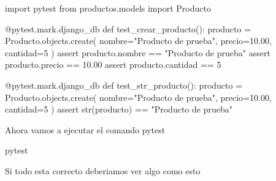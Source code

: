 \documentclass[
  a4paper,
  DIV=11,
  numbers=noendperiod,
  onepage,
  openany]{scrreprt}
\newenvironment{Shaded}{\begin{snugshade}}{\end{snugshade}}
\newcommand{\AttributeTok}[1]{\textcolor[rgb]{0.40,0.45,0.13}{#1}}
\newcommand{\BuiltInTok}[1]{\textcolor[rgb]{0.00,0.23,0.31}{#1}}
\newcommand{\ControlFlowTok}[1]{\textcolor[rgb]{0.00,0.23,0.31}{#1}}
\newcommand{\DecValTok}[1]{\textcolor[rgb]{0.68,0.00,0.00}{#1}}
\newcommand{\ExtensionTok}[1]{\textcolor[rgb]{0.00,0.23,0.31}{#1}}
\newcommand{\FloatTok}[1]{\textcolor[rgb]{0.68,0.00,0.00}{#1}}
\newcommand{\ImportTok}[1]{\textcolor[rgb]{0.00,0.46,0.62}{#1}}
\newcommand{\KeywordTok}[1]{\textcolor[rgb]{0.00,0.23,0.31}{#1}}
\newcommand{\NormalTok}[1]{\textcolor[rgb]{0.00,0.23,0.31}{#1}}
\newcommand{\OperatorTok}[1]{\textcolor[rgb]{0.37,0.37,0.37}{#1}}
\newcommand{\StringTok}[1]{\textcolor[rgb]{0.13,0.47,0.30}{#1}}
\begin{document}
\begin{Shaded}
\begin{Highlighting}[]
\ImportTok{import}\NormalTok{ pytest}
\ImportTok{from}\NormalTok{ productos.models }\ImportTok{import}\NormalTok{ Producto}

\AttributeTok{@pytest.mark.django\_db}
\KeywordTok{def}\NormalTok{ test\_crear\_producto():}
\NormalTok{    producto }\OperatorTok{=}\NormalTok{ Producto.objects.create(}
\NormalTok{        nombre}\OperatorTok{=}\StringTok{"Producto de prueba"}\NormalTok{,}
\NormalTok{        precio}\OperatorTok{=}\FloatTok{10.00}\NormalTok{,}
\NormalTok{        cantidad}\OperatorTok{=}\DecValTok{5}
\NormalTok{    )}
    \ControlFlowTok{assert}\NormalTok{ producto.nombre }\OperatorTok{==} \StringTok{"Producto de prueba"}
    \ControlFlowTok{assert}\NormalTok{ producto.precio }\OperatorTok{==} \FloatTok{10.00}
    \ControlFlowTok{assert}\NormalTok{ producto.cantidad }\OperatorTok{==} \DecValTok{5}

\AttributeTok{@pytest.mark.django\_db}
\KeywordTok{def}\NormalTok{ test\_str\_producto():}
\NormalTok{    producto }\OperatorTok{=}\NormalTok{ Producto.objects.create(}
\NormalTok{        nombre}\OperatorTok{=}\StringTok{"Producto de prueba"}\NormalTok{,}
\NormalTok{        precio}\OperatorTok{=}\FloatTok{10.00}\NormalTok{,}
\NormalTok{        cantidad}\OperatorTok{=}\DecValTok{5}
\NormalTok{    )}
    \ControlFlowTok{assert} \BuiltInTok{str}\NormalTok{(producto) }\OperatorTok{==} \StringTok{"Producto de prueba"}
\end{Highlighting}
\end{Shaded}

Ahora vamos a ejecutar el comando pytest

\begin{Shaded}
\begin{Highlighting}[]
\ExtensionTok{pytest}
\end{Highlighting}
\end{Shaded}

Si todo esta correcto deberiamos ver algo como esto
\end{document}

